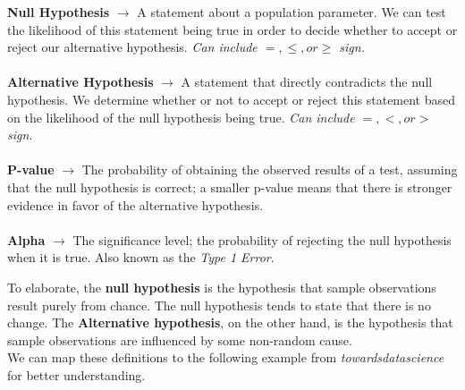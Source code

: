 \documentclass[english, 10pt]{article}
\begin{document}
\begin{tcolorbox}[title=Definition:,colframe=red!75!black,colback=red!5!white,arc=0pt,fonttitle=\bfseries]
\textbf{Null Hypothesis} $\rightarrow$ A statement about a population parameter. We can test the likelihood of this statement being true in order to decide whether to accept or reject our alternative hypothesis. \textit{Can include $=, \leq, or \geq$ sign.}\\\\
\textbf{Alternative Hypothesis} $\rightarrow$ A statement that directly contradicts the null hypothesis. We determine whether or not to accept or reject this statement based on the likelihood of the null hypothesis being true. \textit{Can include $=, <, or >$ sign.}\\\\
\textbf{P-value} $\rightarrow$ The probability of obtaining the observed results of a test, assuming that the null hypothesis is correct; a smaller p-value means that there is stronger evidence in favor of the alternative hypothesis.\\\\
\textbf{Alpha} $\rightarrow$ The significance level; the probability of rejecting the null hypothesis when it is true. Also known as the \textit{Type 1 Error}.
\end{tcolorbox}

\hfill \break To elaborate, the \textbf{null hypothesis} is the hypothesis that sample observations result purely from chance. The null hypothesis tends to state that there is no change. The \textbf{Alternative hypothesis}, on the other hand, is the hypothesis that sample observations are influenced by some non-random cause.\\

We can map these definitions to the following example from \textit{towardsdatascience} for better understanding.\\
\end{document}
